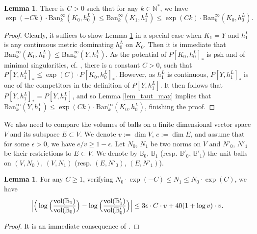 \documentclass[12pt]{article}
\numberwithin{equation}{section}
\theoremstyle{theorem}
\theoremstyle{definition}
\newtheorem{lem}[thm]{Lemma}
\theoremstyle{remark}
\newcommand{\nat}{\mathbb{N}}
\begin{document}
	\begin{lem}\label{eq_lem_comp_sup_nm}
		There is $C > 0$ such that for any $k \in \nat^*$, we have
		\begin{equation}
			\exp(- Ck) \cdot \textrm{Ban}_k^{\infty}(K_0, h^L_0) \leq \textrm{Ban}_k^{\infty}(K_1, h^L_1) \leq \exp(Ck) \cdot \textrm{Ban}_k^{\infty}(K_0, h^L_0).
		\end{equation}
	\end{lem}
	\begin{proof}
		Clearly, it suffices to show Lemma \ref{eq_lem_comp_sup_nm} in a special case when $K_1 = Y$ and $h^L_1$ is any continuous metric dominating $h^L_0$ on $K_0$.
		Then it is immediate that $\textrm{Ban}_k^{\infty}(K_0, h^L_0) \leq \textrm{Ban}_k^{\infty}(Y, h^L_1)$.
		As the potential of $P[K_0, h^L_0]_*$ is psh and of minimal singularities, cf. \cite[Proposition 2.2]{GuedjLuZeriahEnv}, there is a constant $C > 0$, such that $P[Y, h^L_1]_* \leq \exp(C) \cdot P[K_0, h^L_0]_*$.
		However, as $h^L_1$ is continuous, $P[Y, h^L_1]_*$ is one of the competitors in the definition of $P[Y, h^L_1]$.
		It then follows that $P[Y, h^L_1]_* = P[Y, h^L_1]$, and so Lemma \ref{lem_taut_max} implies that $\textrm{Ban}_k^{\infty}(Y, h^L_1) \leq \exp(Ck) \cdot \textrm{Ban}_k^{\infty}(K_0, h^L_0)$, finishing the proof.
	\end{proof}
	We also need to compare the volumes of balls on a finite dimensional vector space $V$ and its subspace $E \subset V$.
	We denote $v := \dim V$, $e := \dim E$, and assume that for some $\epsilon > 0$, we have $e/v \geq 1 - \epsilon$.
	Let $N_0$, $N_1$ be two norms on $V$ and $N'_0$, $N'_1$ be their restrictions to $E \subset V$.
	We denote by $\mathbb{B}_0$, $\mathbb{B}_1$ (resp. $\mathbb{B}'_0$, $\mathbb{B}'_1$) the unit balls on $(V, N_0)$, $(V, N_1)$ (resp. $(E, N'_0)$, $(E, N'_1)$).
	\begin{lem}\label{lem_comp_rest}
		For any $C \geq 1$, verifying $N_0 \cdot \exp(-C) \leq N_1 \leq N_0 \cdot \exp(C)$, we have
		\begin{equation}\label{eq_comp_dist_two}
			\Big| \Big( \log \Big( \frac{{\rm{vol}}(\mathbb{B}_1)}{{\rm{vol}}(\mathbb{B}_0)} \Big) - \log \Big( \frac{{\rm{vol}}(\mathbb{B}'_1)}{{\rm{vol}}(\mathbb{B}'_0)} \Big) \Big|
			\leq
			3 \epsilon \cdot C \cdot v + 40 (1 + \log v) \cdot v.
		\end{equation}
	\end{lem}
	\begin{proof}
		It is an immediate consequence of \cite[Lemmas 2.22 and 3.3]{FinGQBig}.
	\end{proof}
\end{document}
